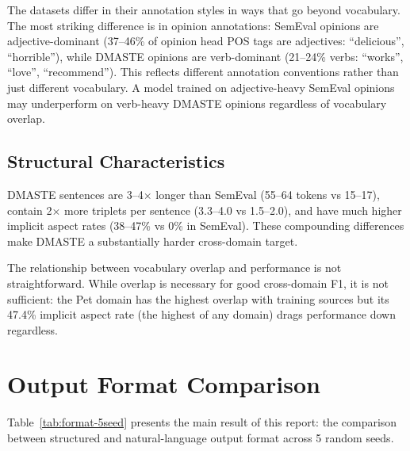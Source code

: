 \documentclass[12pt,a4paper]{report}
\begin{document}
The datasets differ in their annotation styles in ways that go beyond vocabulary. The most striking difference is in opinion annotations: SemEval opinions are adjective-dominant (37--46\% of opinion head POS tags are adjectives: ``delicious'', ``horrible''), while DMASTE opinions are verb-dominant (21--24\% verbs: ``works'', ``love'', ``recommend''). This reflects different annotation conventions rather than just different vocabulary. A model trained on adjective-heavy SemEval opinions may underperform on verb-heavy DMASTE opinions regardless of vocabulary overlap.

\subsection{Structural Characteristics}

DMASTE sentences are 3--4$\times$ longer than SemEval (55--64 tokens vs 15--17), contain 2$\times$ more triplets per sentence (3.3--4.0 vs 1.5--2.0), and have much higher implicit aspect rates (38--47\% vs 0\% in SemEval). These compounding differences make DMASTE a substantially harder cross-domain target.

The relationship between vocabulary overlap and performance is not straightforward. While overlap is necessary for good cross-domain F1, it is not sufficient: the Pet domain has the highest overlap with training sources but its 47.4\% implicit aspect rate (the highest of any domain) drags performance down regardless.


\section{Output Format Comparison}\label{sec:format-results}

Table~\ref{tab:format-5seed} presents the main result of this report: the comparison between structured and natural-language output format across 5 random seeds.
\end{document}
